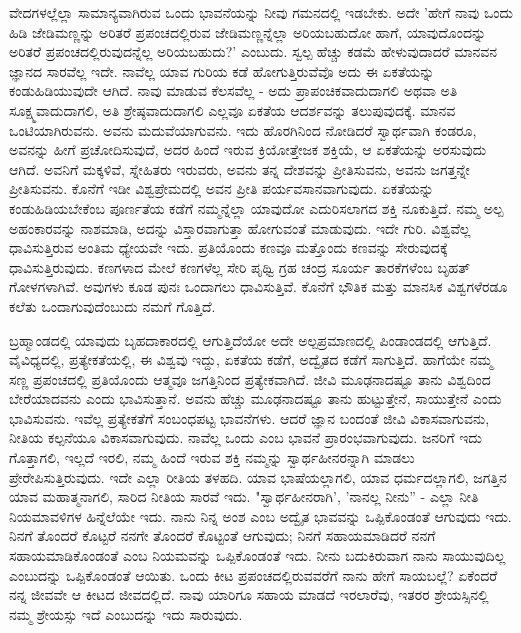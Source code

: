 ವೇದಗಳಲ್ಲೆಲ್ಲಾ ಸಾಮಾನ್ಯವಾಗಿರುವ ಒಂದು ಭಾವನೆಯನ್ನು ನೀವು ಗಮನದಲ್ಲಿ ಇಡಬೇಕು. ಅದೇ 'ಹೇಗೆ ನಾವು ಒಂದು ಹಿಡಿ ಜೇಡಿಮಣ್ಣನ್ನು ಅರಿತರೆ ಪ್ರಪಂಚದಲ್ಲಿರುವ ಜೇಡಿಮಣ್ಣನ್ನೆಲ್ಲಾ ಅರಿಯಬಹುದೋ ಹಾಗೆ, ಯಾವುದೊಂದನ್ನು ಅರಿತರೆ ಪ್ರಪಂಚದಲ್ಲಿರುವುದನ್ನೆಲ್ಲ ಅರಿಯಬಹುದು?' ಎಂಬುದು. ಸ್ವಲ್ಪ ಹೆಚ್ಚು ಕಡಮೆ ಹೇಳುವುದಾದರೆ ಮಾನವನ ಜ್ಞಾನದ ಸಾರವೆಲ್ಲ ಇದೇ. ನಾವೆಲ್ಲ ಯಾವ ಗುರಿಯ ಕಡೆ ಹೋಗುತ್ತಿರುವೆವೊ ಅದು ಈ ಏಕತೆಯನ್ನು ಕಂಡುಹಿಡಿಯುವುದೇ ಆಗಿದೆ. ನಾವು ಮಾಡುವ ಕೆಲಸವೆಲ್ಲ - ಅದು ಪ್ರಾಪಂಚಿಕವಾದುದಾಗಲಿ ಅಥವಾ ಅತಿ ಸೂಕ್ಷ್ಮವಾದುದಾಗಲಿ, ಅತಿ ಶ್ರೇಷ್ಠವಾದುದಾಗಲಿ ಎಲ್ಲವೂ ಏಕತೆಯ ಆದರ್ಶವನ್ನು ತಲುಪುವುದಕ್ಕೆ. ಮಾನವ ಒಂಟಿಯಾಗಿರುವನು. ಅವನು ಮದುವೆಯಾಗುವನು. ಇದು ಹೊರಗಿನಿಂದ ನೋಡಿದರೆ ಸ್ವಾರ್ಥವಾಗಿ ಕಂಡರೂ, ಅವನನ್ನು ಹೀಗೆ ಪ್ರಚೋದಿಸುವುದೆ, ಅದರ ಹಿಂದೆ ಇರುವ ಕ್ರಿಯೋತ್ತೇಜಕ ಶಕ್ತಿಯೆ, ಆ ಏಕತೆಯನ್ನು ಅರಸುವುದು ಆಗಿದೆ. ಅವನಿಗೆ ಮಕ್ಕಳಿವೆ, ಸ್ನೇಹಿತರು ಇರುವರು, ಅವನು ತನ್ನ ದೇಶವನ್ನು ಪ್ರೀತಿಸುವನು, ಅವನು ಜಗತ್ತನ್ನೇ ಪ್ರೀತಿಸುವನು. ಕೊನೆಗೆ ಇಡೀ ವಿಶ್ವಪ್ರೇಮದಲ್ಲಿ ಅವನ ಪ್ರೀತಿ ಪರ್ಯವಸಾನವಾಗುವುದು. ಏಕತೆಯನ್ನು ಕಂಡುಹಿಡಿಯಬೇಕೆಂಬ ಪೂರ್ಣತೆಯ ಕಡೆಗೆ ನಮ್ಮನ್ನೆಲ್ಲಾ ಯಾವುದೋ ಎದುರಿಸಲಾಗದ ಶಕ್ತಿ ನೂಕುತ್ತಿದೆ. ನಮ್ಮ ಅಲ್ಪ ಅಹಂಕಾರವನ್ನು ನಾಶಮಾಡಿ, ಅದನ್ನು ವಿಸ್ತಾರವಾಗುತ್ತಾ ಹೋಗುವಂತೆ ಮಾಡುವುದು. ಇದೇ ಗುರಿ. ವಿಶ್ವವೆಲ್ಲ ಧಾವಿಸುತ್ತಿರುವ ಅಂತಿಮ ಧ್ಯೇಯವೇ ಇದು. ಪ್ರತಿಯೊಂದು ಕಣವೂ ಮತ್ತೊಂದು ಕಣವನ್ನು ಸೇರುವುದಕ್ಕೆ ಧಾವಿಸುತ್ತಿರುವುದು. ಕಣಗಳಾದ ಮೇಲೆ ಕಣಗಳೆಲ್ಲ ಸೇರಿ ಪೃಥ್ವಿ ಗ್ರಹ ಚಂದ್ರ ಸೂರ್ಯ ತಾರಕೆಗಳೆಂಬ ಬೃಹತ್ ಗೋಳಗಳಾಗಿವೆ. ಅವುಗಳು ಕೂಡ ಪುನಃ ಒಂದಾಗಲು ಧಾವಿಸುತ್ತಿವೆ. ಕೊನೆಗೆ ಭೌತಿಕ ಮತ್ತು ಮಾನಸಿಕ ವಿಶ್ವಗಳೆರಡೂ ಕಲೆತು ಒಂದಾಗುವುದೆಂಬುದು ನಮಗೆ ಗೊತ್ತಿದೆ.

ಬ್ರಹ್ಮಾಂಡದಲ್ಲಿ ಯಾವುದು ಬೃಹದಾಕಾರದಲ್ಲಿ ಆಗುತ್ತಿದೆಯೋ ಅದೇ ಅಲ್ಪಪ್ರಮಾಣದಲ್ಲಿ ಪಿಂಡಾಂಡದಲ್ಲಿ ಆಗುತ್ತಿದೆ. ವೈವಿಧ್ಯದಲ್ಲಿ, ಪ್ರತ್ಯೇಕತೆಯಲ್ಲಿ, ಈ ವಿಶ್ವವು ಇದ್ದು, ಏಕತೆಯ ಕಡೆಗೆ, ಅದ್ವೈತದ ಕಡೆಗೆ ಸಾಗುತ್ತಿದೆ. ಹಾಗೆಯೇ ನಮ್ಮ ಸಣ್ಣ ಪ್ರಪಂಚದಲ್ಲಿ ಪ್ರತಿಯೊಂದು ಆತ್ಮವೂ ಜಗತ್ತಿನಿಂದ ಪ್ರತ್ಯೇಕವಾಗಿದೆ. ಜೀವಿ ಮೂಢನಾದಷ್ಟೂ ತಾನು ವಿಶ್ವದಿಂದ ಬೇರೆಯಾದವನು ಎಂದು ಭಾವಿಸುತ್ತಾನೆ. ಅವನು ಹೆಚ್ಚು ಮೂಢನಾದಷ್ಟೂ ತಾನು ಹುಟ್ಟುತ್ತೇನೆ, ಸಾಯುತ್ತೇನೆ ಎಂದು ಭಾವಿಸುವನು. ಇವೆಲ್ಲ ಪ್ರತ್ಯೇಕತೆಗೆ ಸಂಬಂಧಪಟ್ಟ ಭಾವನೆಗಳು. ಆದರೆ ಜ್ಞಾನ ಬಂದಂತೆ ಜೀವಿ ವಿಕಾಸವಾಗುವನು, ನೀತಿಯ ಕಲ್ಪನೆಯೂ ವಿಕಾಸವಾಗುವುದು. ನಾವೆಲ್ಲ ಒಂದು ಎಂಬ ಭಾವನೆ ಪ್ರಾರಂಭವಾಗುವುದು. ಜನರಿಗೆ ಇದು ಗೊತ್ತಾಗಲಿ, ಇಲ್ಲದೆ ಇರಲಿ, ನಮ್ಮ ಹಿಂದೆ ಇರುವ ಶಕ್ತಿ ನಮ್ಮನ್ನು ಸ್ವಾರ್ಥಹೀನರನ್ನಾಗಿ ಮಾಡಲು ಪ್ರೇರೇಪಿಸುತ್ತಿರುವುದು. ಇದೇ ಎಲ್ಲಾ ರೀತಿಯ ತಳಹದಿ. ಯಾವ ಭಾಷೆಯಲ್ಲಾಗಲಿ, ಯಾವ ಧರ್ಮದಲ್ಲಾಗಲಿ, ಜಗತ್ತಿನ ಯಾವ ಮಹಾತ್ಮನಾಗಲಿ, ಸಾರಿದ ನೀತಿಯ ಸಾರವೆ ಇದು. "ಸ್ವಾರ್ಥಹೀನರಾಗಿ', 'ನಾನಲ್ಲ ನೀನು'' - ಎಲ್ಲಾ ನೀತಿ ನಿಯಮಾವಳಿಗಳ ಹಿನ್ನೆಲೆಯೇ ಇದು. ನಾನು ನಿನ್ನ ಅಂಶ ಎಂಬ ಅದ್ವೈತ ಭಾವವನ್ನು ಒಪ್ಪಿಕೊಂಡಂತೆ ಆಗುವುದು ಇದು. ನಿನಗೆ ತೊಂದರೆ ಕೊಟ್ಟರೆ ನನಗೇ ತೊಂದರೆ ಕೊಟ್ಟಂತೆ ಆಗುವುದು; ನಿನಗೆ ಸಹಾಯಮಾಡಿದರೆ ನನಗೆ ಸಹಾಯಮಾಡಿಕೊಂಡಂತೆ ಎಂಬ ನಿಯಮವನ್ನು ಒಪ್ಪಿಕೊಂಡಂತೆ ಇದು. ನೀನು ಬದುಕಿರುವಾಗ ನಾನು ಸಾಯುವುದಿಲ್ಲ ಎಂಬುದನ್ನು ಒಪ್ಪಿಕೊಂಡಂತೆ ಆಯಿತು. ಒಂದು ಕೀಟ ಪ್ರಪಂಚದಲ್ಲಿರುವವರೆಗೆ ನಾನು ಹೇಗೆ ಸಾಯಬಲ್ಲೆ? ಏಕೆಂದರೆ ನನ್ನ ಜೀವವೇ ಆ ಕೀಟದ ಜೀವದಲ್ಲಿದೆ. ನಾವು ಯಾರಿಗೂ ಸಹಾಯ ಮಾಡದೆ ಇರಲಾರೆವು, ಇತರರ ಶ್ರೇಯಸ್ಸಿನಲ್ಲಿ ನಮ್ಮ ಶ್ರೇಯಸ್ಸು ಇದೆ ಎಂಬುದನ್ನು ಇದು ಸಾರುವುದು.

